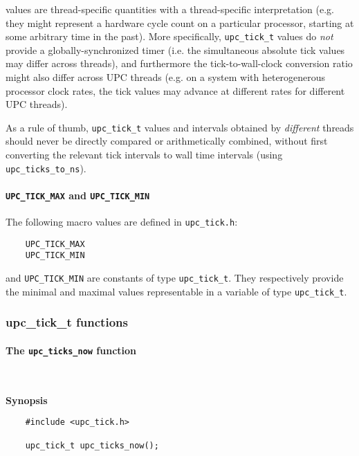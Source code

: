  values are thread-specific quantities with a thread-specific
interpretation (e.g. they might represent a
hardware cycle count on a particular processor, starting at some arbitrary time in
the past).  More specifically,  {\tt upc\_tick\_t} values do {\it not} provide a
globally-synchronized timer (i.e. the simultaneous absolute tick values may
differ across threads), and furthermore the tick-to-wall-clock conversion ratio
might also differ across UPC threads (e.g. on a system with heterogenerous processor
clock rates, the tick values may advance at different rates for different UPC
threads). 

\np As a rule of thumb, {\tt upc\_tick\_t} values and intervals
obtained by {\it different} threads should never be directly
compared or arithmetically combined, without first converting the relevant tick
intervals to wall time intervals (using {\tt upc\_ticks\_to\_ns}).

\paragraph{{\tt UPC\_TICK\_MAX} and {\tt UPC\_TICK\_MIN}}

\npf The following macro values are defined in {\tt upc\_tick.h}:

\begin{verbatim}
    UPC_TICK_MAX
    UPC_TICK_MIN
\end{verbatim}

 and {\tt UPC\_TICK\_MIN} are constants of type {\tt upc\_tick\_t}.
They respectively provide the
minimal and maximal values representable in a variable of type {\tt upc\_tick\_t}.

\subsubsection{upc\_tick\_t functions}

\paragraph{The {\tt upc\_ticks\_now} function}\ \\
\label{upc-ticks-now}

{\bf Synopsis}

\npf\vspace{-2.5em}
 \begin{verbatim}
    #include <upc_tick.h>

    upc_tick_t upc_ticks_now();
\end{verbatim}

